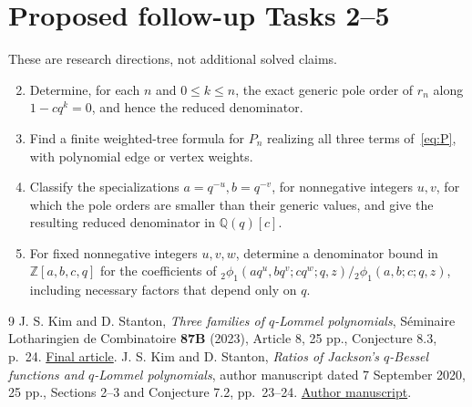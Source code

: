 \documentclass[11pt]{article}
\newcommand{\Z}{\mathbb Z}
\newcommand{\Q}{\mathbb Q}
\begin{document}
\section*{Proposed follow-up Tasks 2--5}
These are research directions, not additional solved claims.
\begin{enumerate}
\setcounter{enumi}{1}
\item Determine, for each $n$ and $0\leq k\leq n$, the exact generic pole
order of $r_n$ along $1-cq^k=0$, and hence the reduced denominator.
\item Find a finite weighted-tree formula for $P_n$ realizing all three
terms of~\eqref{eq:P}, with polynomial edge or vertex weights.
\item Classify the specializations $a=q^{-u}, b=q^{-v}$, for nonnegative
integers $u,v$, for which the pole orders are smaller than their generic
values, and give the resulting reduced denominator in $\Q(q)[c]$.
\item For fixed nonnegative integers $u,v,w$, determine a denominator
bound in $\Z[a,b,c,q]$ for the coefficients of
${}_2\phi_1(aq^u,bq^v;cq^w;q,z)/{}_2\phi_1(a,b;c;q,z)$,
including necessary factors that depend only on $q$.
\end{enumerate}

\begin{thebibliography}{9}
 J. S. Kim and D. Stanton,
\emph{Three families of $q$-Lommel polynomials},
S\'eminaire Lotharingien de Combinatoire \textbf{87B} (2023), Article 8,
25 pp., Conjecture 8.3, p.~24.
\href{https://www.mat.univie.ac.at/~slc/wpapers/lattpath/KimStanton/KimStanton.pdf}{Final article}.
 J. S. Kim and D. Stanton,
\emph{Ratios of Jackson's $q$-Bessel functions and $q$-Lommel polynomials},
author manuscript dated 7 September 2020, 25 pp., Sections 2--3 and
Conjecture 7.2, pp.~23--24.
\href{https://www-users.cse.umn.edu/~stant001/PAPERS/bessel_functions_final.pdf}{Author manuscript}.
\end{thebibliography}
\end{document}
